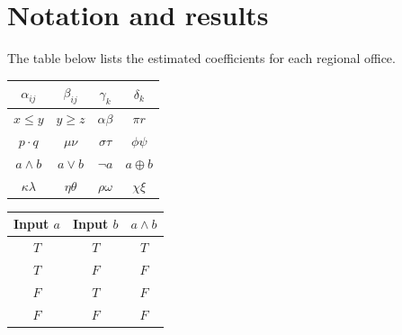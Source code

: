 \documentclass{article}
\begin{document}
\section*{Notation and results}
The table below lists the estimated coefficients for each regional office.

\begin{tabular}{|c|c|c|c|}
\hline
$\alpha_{ij}$ & $\beta_{ij}$ & $\gamma_{k}$ & $\delta_{k}$ \\ \hline
$x\le y$ & $y\ge z$ & $\alpha\beta$ & $\pi r$ \\ \hline
$p\cdot q$ & $\mu\nu$ & $\sigma\tau$ & $\phi\psi$ \\ \hline
$a\wedge b$ & $a\vee b$ & $\neg a$ & $a\oplus b$ \\ \hline
$\kappa\lambda$ & $\eta\theta$ & $\rho\omega$ & $\chi\xi$ \\ \hline
\end{tabular}

\vspace{1cm}
\begin{tabular}{|c|c|c|}
\hline
Input $a$ & Input $b$ & $a \wedge b$ \\ \hline
$T$ & $T$ & $T$ \\ \hline
$T$ & $F$ & $F$ \\ \hline
$F$ & $T$ & $F$ \\ \hline
$F$ & $F$ & $F$ \\ \hline
\end{tabular}
\end{document}
